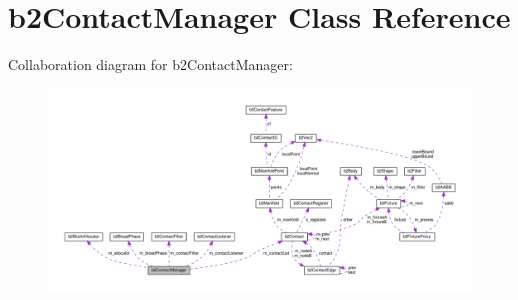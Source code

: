 \hypertarget{classb2ContactManager}{}\section{b2\+Contact\+Manager Class Reference}
\label{classb2ContactManager}


Collaboration diagram for b2\+Contact\+Manager\+:
\nopagebreak
\begin{figure}[H]
\begin{center}
\leavevmode
\includegraphics[width=350pt]{classb2ContactManager__coll__graph}
\end{center}
\end{figure}
